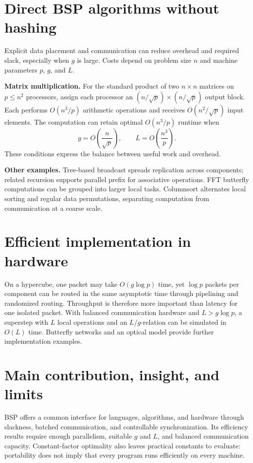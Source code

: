 \documentclass[11pt,a4paper]{article}
\newcommand{\topic}[1]{\section*{#1}}
\begin{document}
\topic{Direct BSP algorithms without hashing}
Explicit data placement and communication can reduce overhead and required
slack, especially when $g$ is large. Costs depend on problem size $n$ and
machine parameters $p$, $g$, and $L$.

\textbf{Matrix multiplication.} For the standard product of two $n\times n$
matrices on $p\leq n^2$ processors, assign each processor an
$(n/\sqrt p)\times(n/\sqrt p)$ output block. Each performs $O(n^3/p)$
arithmetic operations and receives $O(n^2/\sqrt p)$ input elements.
The computation can retain optimal $O(n^3/p)$ runtime when
\[
  g=O\!\left(\frac{n}{\sqrt p}\right),
  \qquad L=O\!\left(\frac{n^3}{p}\right).
\]
These conditions express the balance between useful work and overhead.

\textbf{Other examples.} Tree-based broadcast spreads replication across
components; related recursion supports parallel prefix for associative
operations. FFT butterfly computations can be grouped into larger local
tasks. Columnsort alternates local sorting and regular data permutations,
separating computation from communication at a coarse scale.

\topic{Efficient implementation in hardware}
On a hypercube, one packet may take $O(g\log p)$ time, yet $\log p$ packets
per component can be routed in the same asymptotic time through pipelining
and randomized routing. Throughput is therefore more important than latency
for one isolated packet. With balanced communication hardware and
$L>g\log p$, a superstep with $L$ local operations and an $L/g$-relation
can be simulated in $O(L)$ time. Butterfly networks and an optical model
provide further implementation examples.

\topic{Main contribution, insight, and limits}
BSP offers a common interface for languages, algorithms, and hardware through
slackness, batched communication, and controllable synchronization. Its
efficiency results require enough parallelism, suitable $g$ and $L$, and
balanced communication capacity. Constant-factor optimality also leaves
practical constants to evaluate: portability does not imply that every
program runs efficiently on every machine.
\end{document}
